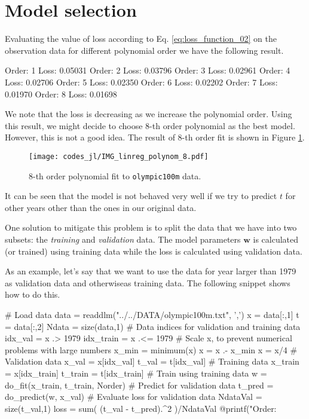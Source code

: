 \documentclass[a4paper,11pt]{article} %
\newcommand{\txtinline}[1]{\texttt{#1}}
\begin{document}
\section{Model selection}

Evaluating the value of loss according to Eq. \eqref{eq:loss_function_02}
on the observation data for different polynomial order
we have the following result.
\begin{textcode}
Order:   1 Loss:    0.05031
Order:   2 Loss:    0.03796
Order:   3 Loss:    0.02961
Order:   4 Loss:    0.02706
Order:   5 Loss:    0.02350
Order:   6 Loss:    0.02202
Order:   7 Loss:    0.01970
Order:   8 Loss:    0.01698    
\end{textcode}
We note that the loss is decreasing as we increase the polynomial order.
Using this result, we might decide to choose 8-th order polynomial as the
best model. However, this is not a good idea.
The result of 8-th order fit is shown in Figure \ref{fig:8th_order_fit}.
\begin{figure}[H]
\begin{center}
\texttt{[image: codes\_jl/IMG\_linreg\_polynom\_8.pdf]}
\end{center}
\caption{8-th order polynomial fit to \txtinline{olympic100m} data.}
\label{fig:8th_order_fit}
\end{figure}
It can be seen that the model is not behaved very well if we try to predict
$t$ for other years other than the ones in our original data.

One solution to mitigate this problem is to split the data that we have
into two subsets: the \emph{training} and \emph{validation} data.
The model parameters $\mathbf{w}$ is calculated (or trained) using
training data while the loss is calculated using validation data.

As an example, let's say that we want to use the data for year larger
than 1979 as validation data and otherwiseas training data. The following
snippet shows how to do this.
\begin{juliacode}
# Load data
data = readdlm("../../DATA/olympic100m.txt", ',')
x = data[:,1]
t = data[:,2]
Ndata = size(data,1)
# Data indices for validation and training data
idx_val = x .> 1979
idx_train = x .<= 1979
# Scale x, to prevent numerical problems with large numbers
x_min = minimum(x)
x = x .- x_min
x = x/4
# Validation data
x_val = x[idx_val]
t_val = t[idx_val]
# Training data
x_train = x[idx_train]
t_train = t[idx_train]
# Train using training data
w = do_fit(x_train, t_train, Norder)
# Predict for validation data
t_pred = do_predict(w, x_val)
# Evaluate loss for validation data
NdataVal = size(t_val,1)
loss = sum( (t_val - t_pred).^2 )/NdataVal
@printf("Order: %
\end{juliacode}
\end{document}
